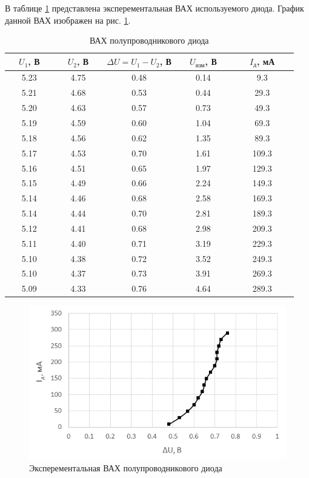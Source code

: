 В таблице \ref{tab:5:1} представлена эксперементальная ВАХ используемого диода. График данной ВАХ изображен на рис. \ref{g:1}.

\begin{table}[H]
	\begin{center}
	\caption{ВАХ полупроводникового диода}
	\def\arraystretch{1.5}
		\begin{tabular}{|c|c|c|c|c|}
		\hline 
		\ \ $U_1$, В\ \  & \ \ $U_2$, В\ \  & $\Delta U = U_1 - U_2$, В & \ \ $U_\text{изм}$, В\ \  & \ \ \ $I_\text{д}$, мА\ \ \ \\ 
		\hline 
		5.23 & 4.75 & 0.48 & 0.14 & 9.3 \\ 
		\hline 
		5.21 & 4.68 & 0.53 & 0.44 & 29.3 \\ 
		\hline 
		5.20 & 4.63 & 0.57 & 0.73 & 49.3 \\ 
		\hline 
		5.19 & 4.59 & 0.60 & 1.04 & 69.3 \\ 
		\hline 
		5.18 & 4.56 & 0.62 & 1.35 & 89.3 \\ 
		\hline 
		5.17 & 4.53 & 0.70 & 1.61 & 109.3 \\ 
		\hline 
		5.16 & 4.51 & 0.65 & 1.97 & 129.3 \\ 
		\hline 
		5.15 & 4.49 & 0.66 & 2.24 & 149.3 \\ 
		\hline 
		5.14 & 4.46 & 0.68 & 2.58 & 169.3 \\ 
		\hline 
		5.14 & 4.44 & 0.70 & 2.81 & 189.3 \\ 
		\hline 
		5.12 & 4.41 & 0.68 & 2.98 & 209.3 \\ 
		\hline 
		5.11 & 4.40 & 0.71 & 3.19 & 229.3 \\ 
		\hline 
		5.10 & 4.38 & 0.72 & 3.52 & 249.3 \\ 
		\hline 
		5.10 & 4.37 & 0.73 & 3.91 & 269.3 \\ 
		\hline 
		5.09 & 4.33 & 0.76 & 4.64 & 289.3 \\ 
		\hline 
		\end{tabular} 
		\label{tab:5:1}
	\end{center}
\end{table}

\begin{figure}[H]
	\begin{center}
		\includegraphics[width=15cm]{img/1}
		\caption{Эксперементальная ВАХ полупроводникового диода}
		\label{g:1} %
	\end{center}
\end{figure}
\newpage
